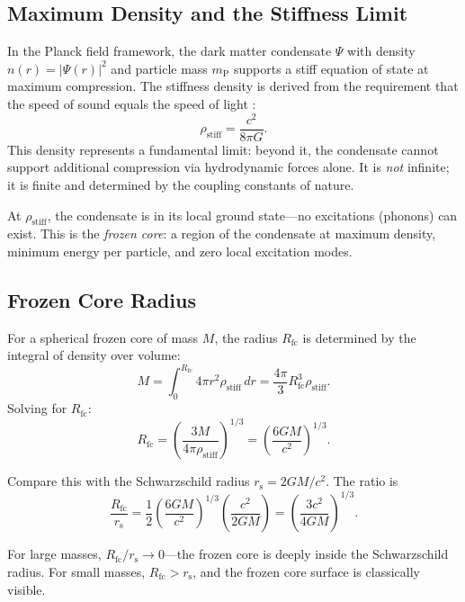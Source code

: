 \documentclass[12pt,a4paper]{article}
\newcommand{\planckmass}{m_\text{P}}
\newcommand{\planckfield}{\Psi}
\newcommand{\rhostiff}{\rho_\text{stiff}}
\newcommand{\Rfc}{R_\text{fc}}
\theoremstyle{definition}
\begin{document}
\subsection{Maximum Density and the Stiffness Limit}
\label{subsec:stiffness_limit}

In the Planck field framework, the dark matter condensate $\planckfield$ with density $n(r) = |\planckfield(r)|^2$ and particle mass $\planckmass$ supports a stiff equation of state at maximum compression. The stiffness density is derived from the requirement that the speed of sound equals the speed of light \cite{PlanckFieldI}:
\begin{equation}
\rhostiff = \frac{c^2}{8\pi G}.
\label{eq:rho_stiff}
\end{equation}
This density represents a fundamental limit: beyond it, the condensate cannot support additional compression via hydrodynamic forces alone. It is \emph{not} infinite; it is finite and determined by the coupling constants of nature.

At $\rhostiff$, the condensate is in its local ground state—no excitations (phonons) can exist. This is the \emph{frozen core}: a region of the condensate at maximum density, minimum energy per particle, and zero local excitation modes.

\subsection{Frozen Core Radius}
\label{subsec:frozen_core_radius}

For a spherical frozen core of mass $M$, the radius $\Rfc$ is determined by the integral of density over volume:
\begin{equation}
M = \int_0^{\Rfc} 4\pi r^2 \rhostiff \, dr = \frac{4\pi}{3} \Rfc^3 \rhostiff.
\end{equation}
Solving for $\Rfc$:
\begin{equation}
\Rfc = \left( \frac{3M}{4\pi \rhostiff} \right)^{1/3} = \left( \frac{6GM}{c^2} \right)^{1/3}.
\label{eq:Rfc}
\end{equation}

Compare this with the Schwarzschild radius $r_\text{s} = 2GM/c^2$. The ratio is
\begin{equation}
\frac{\Rfc}{r_\text{s}} = \frac{1}{2} \left( \frac{6GM}{c^2} \right)^{1/3} \left( \frac{c^2}{2GM} \right) = \left( \frac{3c^2}{4GM} \right)^{1/3}.
\label{eq:Rfc_over_rs}
\end{equation}

For large masses, $\Rfc/r_\text{s} \to 0$—the frozen core is deeply inside the Schwarzschild radius. For small masses, $\Rfc > r_\text{s}$, and the frozen core surface is classically visible.
\end{document}
